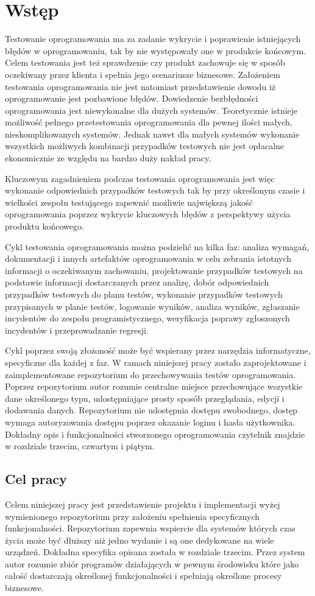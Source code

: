\chapter{Wstęp}
Testowanie oprogramowania ma za zadanie wykrycie i poprawienie istniejących błędów w oprogramowaniu, tak by nie występowały one w produkcie końcowym. Celem testowania jest też sprawdzenie czy produkt zachowuje się w sposób oczekiwany przez klienta i spełnia jego scenariusze biznesowe. Założeniem testowania oprogramowania nie jest natomiast przedstawienie dowodu iż oprogramowanie jest pozbawione błędów. Dowiedzenie bezbłędności oprogramowania jest niewykonalne dla dużych systemów. Teoretycznie istnieje możliwość pełnego przetestowania oprogramowania dla pewnej ilości małych, nieskomplikowanych systemów. Jednak nawet dla małych systemów wykonanie wszystkich możliwych kombinacji przypadków testowych nie jest opłacalne ekonomicznie ze względu na bardzo duży nakład pracy. 

Kluczowym zagadnieniem podczas testowania oprogramowania jest więc wykonanie odpowiednich przypadków testowych tak by przy określonym czasie i wielkości zespołu testującego zapewnić możliwie największą jakość oprogramowania poprzez wykrycie kluczowych błędów z perspektywy użycia produktu końcowego.  

Cykl testowania oprogramowania można podzielić na kilka faz: analiza wymagań, dokumentacji i innych artefaktów oprogramowania w celu zebrania istotnych informacji o oczekiwanym zachowaniu, projektowanie przypadków testowych na podstawie informacji dostarczanych przez analizę, dobór odpowiednich przypadków testowych do planu testów, wykonanie przypadków testowych przypisanych w planie testów, logowanie wyników, analiza wyników, zgłaszanie incydentów do zespołu programistycznego, weryfikacja poprawy zgłoszonych incydentów i przeprowadzanie regresji.

Cykl poprzez swoją złożoność może być wspierany przez narzędzia informatyczne, specyficzne dla każdej z faz. W ramach niniejszej pracy zostało zaprojektowane i zaimplementowane repozytorium do przechowywania testów oprogramowania. Poprzez repozytorium autor rozumie centralne miejsce przechowujące wszystkie dane określonego typu, udostępniające prosty sposób przeglądania, edycji i dodawania danych. Repozytorium nie udostępnia dostępu swobodnego, dostęp wymaga autoryzowania dostępu poprzez okazanie loginu i hasła użytkownika. Dokładny opis i funkcjonalności stworzonego oprogramowania czytelnik znajdzie w rozdziale trzecim, czwartym i piątym. 
\section{Cel pracy}
Celem niniejszej pracy jest przedstawienie projektu i implementacji wyżej wymienionego repozytorium przy założeniu spełnienia specyficznych funkcjonalności. Repozytorium zapewnia wspiercie dla systemów których czas życia może być dłuższy niż jedno wydanie i są one dedykowane na wiele urządzeń. Dokładna specyfika opisana została w rozdziale trzecim. Przez system autor rozumie zbiór programów działających w pewnym środowisku które jako całość dostarczają określonej funkcjonalności i spełniają określone procesy biznesowe. 
